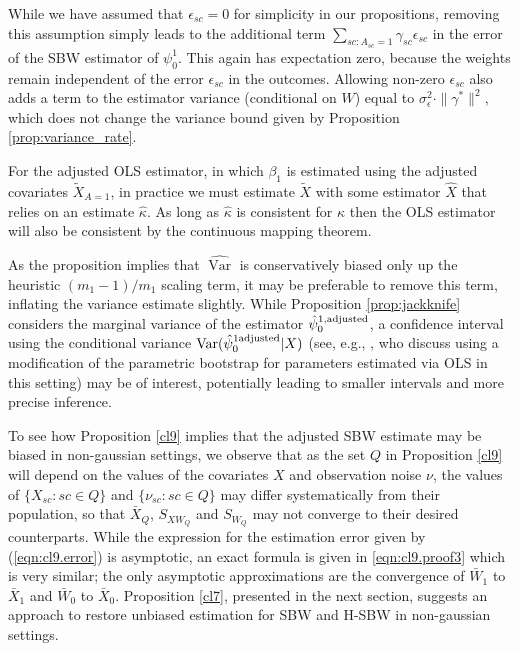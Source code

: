 \begin{remark}
    While we have assumed that $\epsilon_{sc}=0$ for simplicity in our propositions, removing this assumption simply leads to the additional term $\sum_{sc: A_{sc} = 1}\gamma_{sc}\epsilon_{sc}$ in the error of the SBW estimator of $\psi_0^1$. This again has expectation zero, because the weights remain independent of the error $\epsilon_{sc}$ in the outcomes. Allowing non-zero $\epsilon_{sc}$ also adds a term to the estimator variance (conditional on $W$) equal to $\sigma^2_{\epsilon}\cdot \|\gamma^*\|^2$,    which does not change the variance bound given by Proposition \ref{prop:variance_rate}.
\end{remark}


\begin{remark}
    For the adjusted OLS estimator, in which $\beta_1$ is estimated using the adjusted covariates $\tilde{X}_{A=1}$, in practice we must estimate $\tilde{X}$ with some estimator $\hat{X}$ that relies on an estimate $\hat{\kappa}$. As long as $\hat{\kappa}$ is consistent for $\kappa$ then the OLS estimator will also be consistent by the continuous mapping theorem.
\end{remark}

\begin{remark}
As the proposition implies that $\hat{\operatorname{Var}}$ is conservatively biased only up the heuristic $(m_1-1)/m_1$ scaling term, it may be preferable to remove this term, inflating the variance estimate slightly. While Proposition \ref{prop:jackknife} considers the marginal variance of the estimator $\hat{\psi}_0^{1,\textup{adjusted}}$, a confidence interval using the conditional variance $\operatorname{Var}(\hat{\psi}_0^{1 \textup{adjusted}}|X)$ (see, e.g., \cite{buonaccorsi2010measurement}, who discuss using a modification of the parametric bootstrap for parameters estimated via OLS in this setting) may be of interest, potentially leading to smaller intervals and more precise inference. 
\end{remark}


\begin{remark}
To see how Proposition \ref{cl9} implies that the adjusted SBW estimate may be biased in non-gaussian settings, we observe that as the set $Q$ in Proposition \ref{cl9} will depend on the values of the covariates $X$ and observation noise $\nu$, the values of $\{X_{sc}: sc \in Q\}$ and $\{\nu_{sc}: sc \in Q\}$ may differ systematically from their population, so that $\bar{X}_Q$, $S_{XW_Q}$ and $S_{W_Q}$ may not converge to their desired counterparts. While the expression for the estimation error given by (\ref{eqn:cl9.error}) is asymptotic, an exact formula is given in  \eqref{eqn:cl9.proof3} which is very similar; the only asymptotic approximations are the convergence of $\bar{W}_1$ to $\bar{X}_1$ and $\bar{W}_0$ to $\bar{X}_0$. Proposition \ref{cl7}, presented in the next section, suggests an approach to restore unbiased estimation for SBW and H-SBW in non-gaussian settings.
\end{remark}


